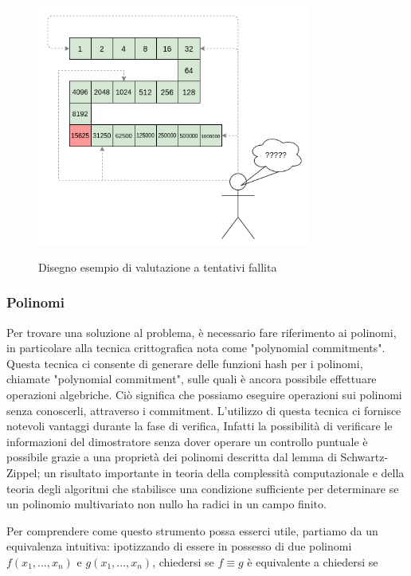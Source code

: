 \begin{figure}[H]
    \centering
    \includegraphics[width=9cm]{./chapters/1.state-of-art/images/6.hope_evaluation.png}
    \label{fig:hope-evaluation}
    \captionsetup{justification=centering}
    \caption{Disegno esempio di valutazione a tentativi fallita}
\end{figure}

\subsubsection{Polinomi}

Per trovare una soluzione al problema, è necessario fare riferimento ai polinomi, in particolare alla tecnica
crittografica nota come "polynomial commitments". Questa tecnica ci consente di generare delle funzioni hash per i
polinomi, chiamate "polynomial commitment", sulle quali è ancora possibile effettuare operazioni algebriche. Ciò
significa che possiamo eseguire operazioni sui polinomi senza conoscerli, attraverso i commitment. L'utilizzo di questa
tecnica ci fornisce notevoli vantaggi durante la fase di verifica, Infatti la possibilità di verificare le informazioni
del dimostratore senza dover operare un controllo puntuale è possibile grazie a una proprietà dei polinomi descritta dal
lemma di Schwartz-Zippel; un risultato importante in teoria della complessità
computazionale e della teoria degli algoritmi che stabilisce una condizione sufficiente per determinare se un polinomio
multivariato non nullo ha radici in un campo finito.

Per comprendere come questo strumento possa esserci utile, partiamo da un equivalenza intuitiva: ipotizzando di essere
in possesso di due polinomi $f(x_1,...,x_n)$ e $g(x_1,...,x_n)$, chiedersi se $f \equiv g$ è
equivalente a chiedersi se 

